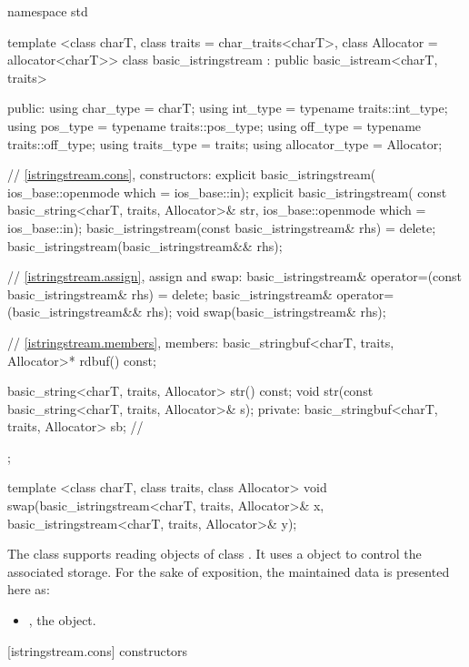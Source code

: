 %
\begin{codeblock}
namespace std {
  template <class charT, class traits = char_traits<charT>,
            class Allocator = allocator<charT>>
  class basic_istringstream
    : public basic_istream<charT, traits> {
  public:
    using char_type      = charT;
    using int_type       = typename traits::int_type;
    using pos_type       = typename traits::pos_type;
    using off_type       = typename traits::off_type;
    using traits_type    = traits;
    using allocator_type = Allocator;

    // \ref{istringstream.cons}, constructors:
    explicit basic_istringstream(
      ios_base::openmode which = ios_base::in);
    explicit basic_istringstream(
      const basic_string<charT, traits, Allocator>& str,
      ios_base::openmode which = ios_base::in);
    basic_istringstream(const basic_istringstream& rhs) = delete;
    basic_istringstream(basic_istringstream&& rhs);

    // \ref{istringstream.assign}, assign and swap:
    basic_istringstream& operator=(const basic_istringstream& rhs) = delete;
    basic_istringstream& operator=(basic_istringstream&& rhs);
    void swap(basic_istringstream& rhs);

    // \ref{istringstream.members}, members:
    basic_stringbuf<charT, traits, Allocator>* rdbuf() const;

    basic_string<charT, traits, Allocator> str() const;
    void str(const basic_string<charT, traits, Allocator>& s);
  private:
    basic_stringbuf<charT, traits, Allocator> sb; // \expos
  };

  template <class charT, class traits, class Allocator>
    void swap(basic_istringstream<charT, traits, Allocator>& x,
              basic_istringstream<charT, traits, Allocator>& y);
}
\end{codeblock}

\pnum
The class
supports reading objects of class
.
It uses a
object to control the associated storage.
For the sake of exposition, the maintained data is presented here as:
\begin{itemize}
\item
{}, the  object.
\end{itemize}

[istringstream.cons]{ constructors}

